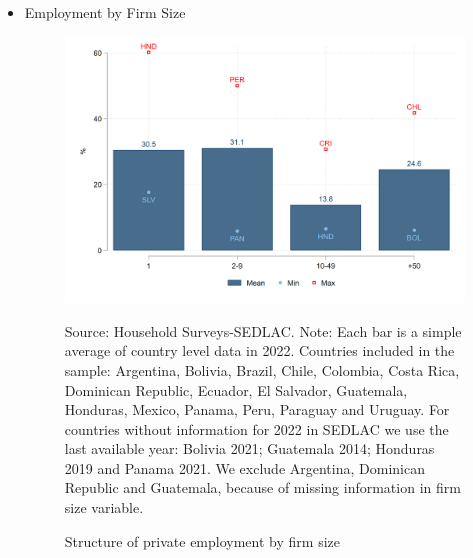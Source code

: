 \documentclass[english]{article}
\begin{document}
\begin{itemize}
            
        \item Employment by Firm Size
            \begin{figure}[H]
                    \justifying
                    \caption{Structure of private employment by firm size}     
                    \centerline{\includegraphics[scale=.3]{latex/figures/Snapshot/Structure of employment by firm size.png}
                    \label{fig:firmsize}}
                    \footnotesize{Source: Household Surveys-SEDLAC.}
                    \footnotesize{Note: Each bar is a simple average of country level data in 2022. Countries included in the sample: Argentina, Bolivia, Brazil, Chile, Colombia, Costa Rica, Dominican Republic, Ecuador, El Salvador, Guatemala, Honduras, Mexico, Panama, Peru, Paraguay and Uruguay. For countries without information for 2022 in SEDLAC we use the last available year: Bolivia 2021; Guatemala 2014; Honduras 2019 and Panama 2021. We exclude Argentina, Dominican Republic and Guatemala, because of missing information in firm size variable.}
            \end{figure}
            

\end{itemize}
\end{document}
